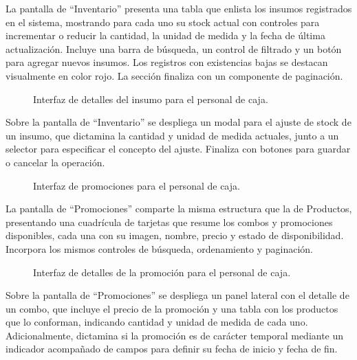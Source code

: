La pantalla de ``Inventario'' presenta una tabla que enlista los insumos registrados en el sistema, mostrando para cada uno su stock actual con controles para incrementar o reducir la cantidad, la unidad de medida y la fecha de última actualización. Incluye una barra de búsqueda, un control de filtrado y un botón para agregar nuevos insumos. Los registros con existencias bajas se destacan visualmente en color rojo. La sección finaliza con un componente de paginación.

\begin{figure}[H]
    \centering
    
    \caption{Interfaz de detalles del insumo para el personal de caja.}
    \label{fig:ui-caj-07}
\end{figure}

Sobre la pantalla de ``Inventario'' se despliega un modal para el ajuste de stock de un insumo, que dictamina la cantidad y unidad de medida actuales, junto a un selector para especificar el concepto del ajuste. Finaliza con botones para guardar o cancelar la operación.

\begin{figure}[H]
    \centering
    
    \caption{Interfaz de promociones para el personal de caja.}
    \label{fig:ui-caj-08}
\end{figure}

La pantalla de ``Promociones'' comparte la misma estructura que la de Productos, presentando una cuadrícula de tarjetas que resume los combos y promociones disponibles, cada una con su imagen, nombre, precio y estado de disponibilidad. Incorpora los mismos controles de búsqueda, ordenamiento y paginación.

\begin{figure}[H]
    \centering
    
    \caption{Interfaz de detalles de la promoción para el personal de caja.}
    \label{fig:ui-caj-08-a}
\end{figure}

Sobre la pantalla de ``Promociones'' se despliega un panel lateral con el detalle de un combo, que incluye el precio de la promoción y una tabla con los productos que lo conforman, indicando cantidad y unidad de medida de cada uno. Adicionalmente, dictamina si la promoción es de carácter temporal mediante un indicador acompañado de campos para definir su fecha de inicio y fecha de fin.

